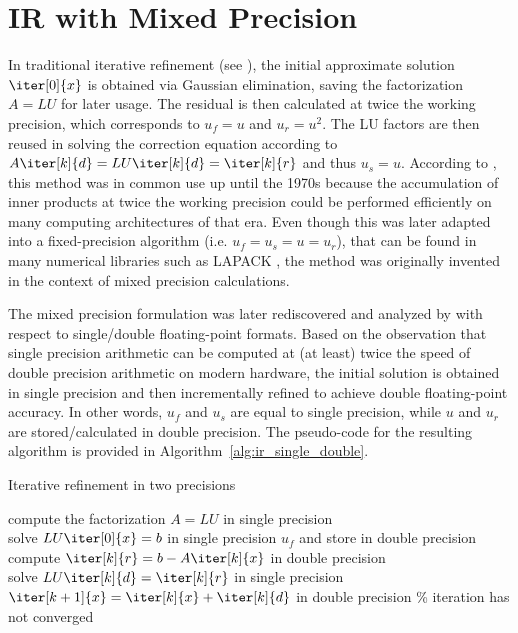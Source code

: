 \section{IR with Mixed Precision}
\label{sec:low_precision_ir}

In traditional iterative refinement (see \cite{wilkinson_rounding_1963}), the initial approximate solution $\iter[0]{x}$ is obtained via Gaussian elimination, saving the factorization $A=LU$ for later usage. The residual is then calculated at twice the working precision, which corresponds to $u_f=u$ and $u_r=u^2$. The LU factors are then reused in solving the correction equation according to $A\iter[k]{d} = LU\iter[k]{d} = \iter[k]{r}$ and thus $u_s=u$. According to \cite{carson_accelerating_2018}, this method was in common use up until the 1970s because the accumulation of inner products at twice the working precision could be performed efficiently on many computing architectures of that era. Even though this was later adapted into a fixed-precision algorithm (i.e. $u_f=u_s=u=u_r$), that can be found in many numerical libraries such as LAPACK \cite{anderson_lapack_1999}, the method was originally invented in the context of mixed precision calculations.

The mixed precision formulation was later rediscovered and analyzed by \cite{langou_exploiting_2006} with respect to single/double floating-point formats. Based on the observation that single precision arithmetic can be computed at (at least) twice the speed of double precision arithmetic on modern hardware, the initial solution is obtained in single precision and then incrementally refined to achieve double floating-point accuracy. In other words, $u_f$ and $u_s$ are equal to single precision, while $u$ and $u_r$ are stored/calculated in double precision. The pseudo-code for the resulting algorithm is provided in Algorithm~\hyperref[alg:ir_single_double]{\ref{alg:ir_single_double}}.

\begin{algorithm}[h]
  \caption{Iterative refinement in two precisions}
  \label{alg:ir_single_double}
  \SetAlgoLined
  compute the factorization $A=LU$ in single precision \\
  solve $LU\iter[0]{x}=b$ in single precision $u_f$ and store in double precision \\
   {
    compute $\iter[k]{r} = b-A\iter[k]{x}$ in double precision  \\
    solve $LU\iter[k]{d}=\iter[k]{r}$ in single precision \\
    $\iter[k+1]{x}=\iter[k]{x}+\iter[k]{d}$ in double precision}
  \% iteration has not converged
\end{algorithm}

